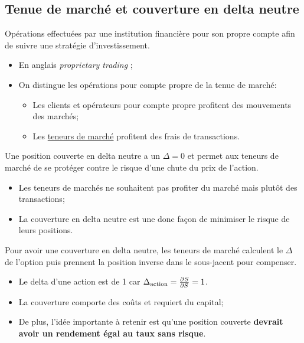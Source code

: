 \documentclass[10pt, french]{article}
\begin{document}
\begin{multicols*}{2}
\section{Tenue de marché et couverture en delta neutre}

\begin{definitionNOHFILL}
Opérations effectuées par une institution financière pour son propre compte afin de suivre une stratégie d'investissement.

\begin{itemize}[leftmargin = *]
\item	En anglais \og \textit{proprietary trading} \fg{};
\item	On distingue les opérations pour compte propre de la tenue de marché:
	\begin{itemize}[leftmargin = *]
	\item	Les clients et opérateurs pour compte propre profitent des mouvements des marchés;
	\item	Les \hyperlink{market_holder}{\color{blue}teneurs de marché} profitent des frais de transactions.
	\end{itemize}
\end{itemize}
\end{definitionNOHFILL}

\begin{definitionNOHFILLsub}
Une position couverte en delta neutre a un $\Delta = 0$ et permet aux teneurs de marché de se protéger contre le risque d'une chute du prix de l'action.

\begin{rappel_enhanced}[Contexte]
\begin{itemize}[leftmargin = *]
	\item	Les teneurs de marchés ne souhaitent pas profiter du marché mais plutôt des transactions;
	\item	La couverture en delta neutre est une donc façon de minimiser le risque de leurs positions.
\end{itemize}
\end{rappel_enhanced}

Pour avoir une couverture en delta neutre, les teneurs de marché calculent le $\Delta$ de l'option puis prennent la position inverse dans le sous-jacent pour compenser. 
\begin{itemize}[leftmargin = *]
	\item	Le delta d'une action est de 1 car $\Delta_{\text{action}}	=	\frac{\partial^{}S}{\partial S^{}} = 1$.
	\item	La couverture comporte des coûts et requiert du capital;
	\item	De plus, l'idée importante à retenir est qu'une position couverte \textbf{devrait avoir un rendement égal au taux sans risque}.
\end{itemize}


\end{definitionNOHFILLsub}
\end{multicols*}
\end{document}
